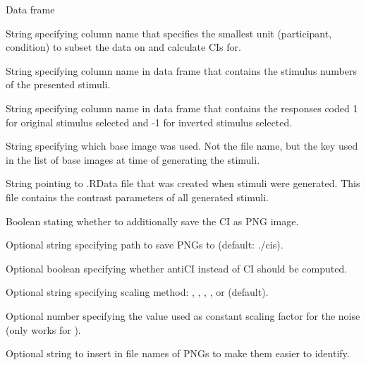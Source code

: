 \documentclass[letterpaper]{book}
\begin{document}
%
\begin{Arguments}
\begin{ldescription}
\item[\code{data}] Data frame

\item[\code{by}] String specifying column name that specifies the smallest unit (participant, condition) to subset the data on and calculate CIs for.

\item[\code{stimuli}] String specifying column name in data frame that contains the stimulus numbers of the presented stimuli.

\item[\code{responses}] String specifying column name in data frame that contains the responses coded 1 for original stimulus selected and -1 for inverted stimulus selected.

\item[\code{baseimage}] String specifying which base image was used. Not the file name, but the key used in the list of base images at time of generating the stimuli.

\item[\code{rdata}] String pointing to .RData file that was created when stimuli were generated. This file contains the contrast parameters of all generated stimuli.

\item[\code{save\_as\_png}] Boolean stating whether to additionally save the CI as PNG image.

\item[\code{targetpath}] Optional string specifying path to save PNGs to (default: ./cis).

\item[\code{antiCI}] Optional boolean specifying whether antiCI instead of CI should be computed.

\item[\code{scaling}] Optional string specifying scaling method: , , , , or  (default).

\item[\code{constant}] Optional number specifying the value used as constant scaling factor for the noise (only works for ).

\item[\code{label}] Optional string to insert in file names of PNGs to make them easier to identify.
\end{ldescription}
\end{Arguments}
\end{document}
